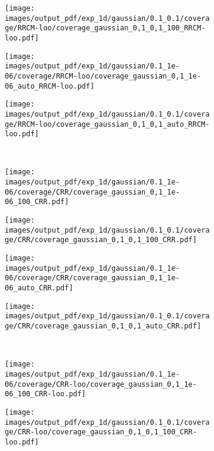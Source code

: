 \documentclass[a4paper,14pt]{extarticle}
\begin{document}
\begin{figure}
\begin{subfigure}[b]{0.25\linewidth}
  \end{subfigure}%
  \begin{subfigure}[b]{0.25\linewidth}
    \texttt{[image: images/output\_pdf/exp\_1d/gaussian/0.1\_0.1/coverage/RRCM-loo/coverage\_gaussian\_0,1\_0,1\_100\_RRCM-loo.pdf]}
  \end{subfigure}%
  \begin{subfigure}[b]{0.25\linewidth}
    \texttt{[image: images/output\_pdf/exp\_1d/gaussian/0.1\_1e-06/coverage/RRCM-loo/coverage\_gaussian\_0,1\_1e-06\_auto\_RRCM-loo.pdf]}
  \end{subfigure}%
  \begin{subfigure}[b]{0.25\linewidth}
    \texttt{[image: images/output\_pdf/exp\_1d/gaussian/0.1\_0.1/coverage/RRCM-loo/coverage\_gaussian\_0,1\_0,1\_auto\_RRCM-loo.pdf]}
  \end{subfigure}\\
  \begin{subfigure}[b]{0.25\linewidth}
    \texttt{[image: images/output\_pdf/exp\_1d/gaussian/0.1\_1e-06/coverage/CRR/coverage\_gaussian\_0,1\_1e-06\_100\_CRR.pdf]}
  \end{subfigure}%
  \begin{subfigure}[b]{0.25\linewidth}
    \texttt{[image: images/output\_pdf/exp\_1d/gaussian/0.1\_0.1/coverage/CRR/coverage\_gaussian\_0,1\_0,1\_100\_CRR.pdf]}
  \end{subfigure}%
  \begin{subfigure}[b]{0.25\linewidth}
    \texttt{[image: images/output\_pdf/exp\_1d/gaussian/0.1\_1e-06/coverage/CRR/coverage\_gaussian\_0,1\_1e-06\_auto\_CRR.pdf]}
  \end{subfigure}%
  \begin{subfigure}[b]{0.25\linewidth}
    \texttt{[image: images/output\_pdf/exp\_1d/gaussian/0.1\_0.1/coverage/CRR/coverage\_gaussian\_0,1\_0,1\_auto\_CRR.pdf]}
  \end{subfigure}\\
  \begin{subfigure}[b]{0.25\linewidth}
    \texttt{[image: images/output\_pdf/exp\_1d/gaussian/0.1\_1e-06/coverage/CRR-loo/coverage\_gaussian\_0,1\_1e-06\_100\_CRR-loo.pdf]}
  \end{subfigure}%
  \begin{subfigure}[b]{0.25\linewidth}
    \texttt{[image: images/output\_pdf/exp\_1d/gaussian/0.1\_0.1/coverage/CRR-loo/coverage\_gaussian\_0,1\_0,1\_100\_CRR-loo.pdf]}

\end{subfigure}
\end{figure}
\end{document}

